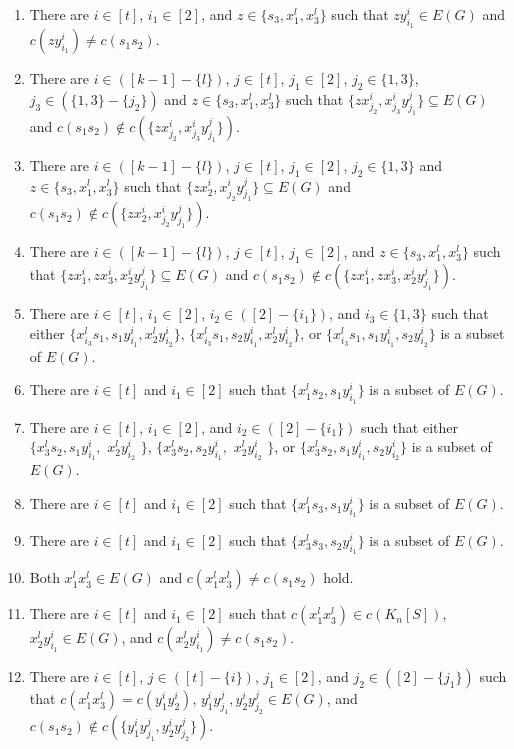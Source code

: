 \documentclass[12pt]{article}
\begin{document}
\begin{enumerate}
  \item There are $i\in[t]$, $i_1\in[2]$, and $z\in\{s_3,x^l_1,x^l_3\}$ such that $zy^i_{i_1}\in E(G)$ and $c(zy^i_{i_1})\neq c(s_1s_2)$.
 \item There are $i \in ([k-1]-\{l\})$, $j \in [t]$, $j_1\in[2]$, $j_2\in\{1,3\}$, $j_3\in(\{1,3\}-\{j_2\})$ and $z\in\{s_3,x^l_1,x^l_3\}$ such that $\{z x_{j_2}^i,x_{j_3}^i y_{j_1}^j\}\subseteq E(G)$ and $c(s_1s_2)\not\in c(\{z x_{j_2}^i,x_{j_3}^i y_{j_1}^j\})$.
  \item There are $i \in ([k-1]-\{l\})$, $j \in [t]$, $j_1\in[2]$, $j_2\in\{1,3\}$ and $z\in\{s_3,x^l_1,x^l_3\}$ such that $\{z x_{2}^i,x_{j_2}^i y_{j_1}^j\}\subseteq E(G)$ and $c(s_1s_2)\not\in c(\{z x_{2}^i,x_{j_2}^i y_{j_1}^j\})$.
  \item There are $i \in ([k-1]-\{l\})$, $j \in [t]$, $j_1\in[2]$, and $z\in\{s_3,x^l_1,x^l_3\}$ such that $\{z x_{1}^i,zx_3^i,x_{2}^i y_{j_1}^j\}\subseteq E(G)$ and $c(s_1s_2)\not\in c(\{z x_{1}^i,zx_3^i,x_{2}^i y_{j_1}^j\})$.
  \item There are $i\in[t]$, $i_1\in[2]$, $i_2\in([2]-\{i_1\})$, and $i_{3}\in\{1,3\}$ such that either $\{x^l_{i_3}s_1,s_1y^i_{i_1},x^l_2y^i_{i_2}\}$, $\{x^l_{i_3}s_1,s_2y^i_{i_1},x^l_2y^i_{i_2}\}$, or $\{x^l_{i_3}s_1,s_1y^i_{i_1},s_2y^i_{i_2}\}$ is a subset of $E(G)$.
  \item There are $i\in[t]$ and $i_1\in[2]$ such that $\{x^l_1s_2,s_1y^i_{i_1}\}$ is a subset of $E(G)$.
   \item There are $i\in[t]$, $i_1\in[2]$, and $i_2\in([2]-\{i_1\})$ such that either $\{x^l_{3}s_2,s_1y^i_{i_1},$ $x^l_2y^i_{i_2}$ $\}$, $\{x^l_{3}s_2,s_2y^i_{i_1},$ $x^l_2y^i_{i_2}$ $\}$, or $\{x^l_{3}s_2,s_1y^i_{i_1},s_2y^i_{i_2}\}$ is a subset of $E(G)$.
   \item There are $i\in[t]$ and $i_1\in[2]$ such that $\{x^l_{1}s_3,s_1y^i_{i_1}\}$ is a subset of $E(G)$.
   \item There are $i\in[t]$ and $i_1\in[2]$ such that $\{x^l_{3}s_3,s_2y^i_{i_1}\}$ is a subset of $E(G)$.
   \item Both \( x_1^lx_3^l\in E(G) \) and $c(x_1^lx_3^l)\neq c(s_1s_2)$ hold.
   \item There are $i\in[t]$ and $i_1\in[2]$ such that \(c(x_1^l x_3^l) \in c(K_n[S])\), $x^l_2y^i_{i_1}\in E(G)$, and $c(x^l_2y^i_{i_1})\neq c(s_1s_2)$.
    \item There are \( i\in[t] \), \( j \in ([t] - \{i\}) \), $j_1\in[2]$, and $j_2\in([2]-\{j_1\})$ such that \( c(x_1^l x_3^l) = c(y_1^i y_2^i) \), $y_{1}^i y_{j_1}^j,y_{2}^i y_{j_2}^j\in E(G)$,  and $c(s_1s_2)\not\in c(\{y_{1}^i y_{j_1}^j,y_{2}^i y_{j_2}^j\})$.

\end{enumerate}
\end{document}
